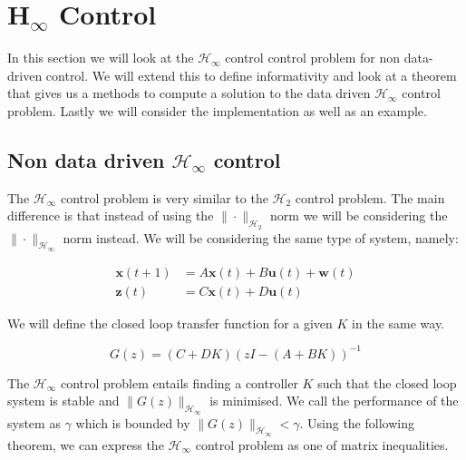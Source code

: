 \section{H$_\infty$ Control}
In this section we will look at the $\mathcal{H}_\infty$ control control problem for non data-driven control. We will extend this to define informativity and look at a theorem that gives us a methods to compute a solution to the data driven $\mathcal{H}_\infty$ control problem. Lastly we will consider the implementation as well as an example.

\subsection{Non data driven $\mathcal{H}_\infty$ control}
The $\mathcal{H}_\infty$ control problem is very similar to the $\mathcal{H}_2$ control problem. The main difference is that instead of using the $\| \cdot \|_{\mathcal{H}_2}$ norm we will be considering the $\| \cdot \|_{\mathcal{H}_\infty}$ norm instead. We will be considering the same type of system, namely:

\begin{align*}
	\mathbf{x}(t+1) &= A \mathbf{x}(t) + B \mathbf{u}(t) + \mathbf{w}(t) \\
	\mathbf{z}(t)   &= C \mathbf{x}(t) + D \mathbf{u}(t)
\end{align*}

We will define the closed loop transfer function for a given $K$ in the same way.

\begin{equation*}
	G(z) = (C + DK)(z I - (A+BK))^{-1}
\end{equation*}

The $\mathcal{H}_\infty$ control problem entails finding a controller $K$ such that the closed loop system is stable and $\| G(z) \|_{\mathcal{H}_\infty}$ is minimised. We call the performance of the system as $\gamma$ which is bounded by $\| G(z) \|_{\mathcal{H}_\infty} < \gamma$. Using the following theorem, we can express the $\mathcal{H}_\infty$ control problem as one of matrix inequalities. 



